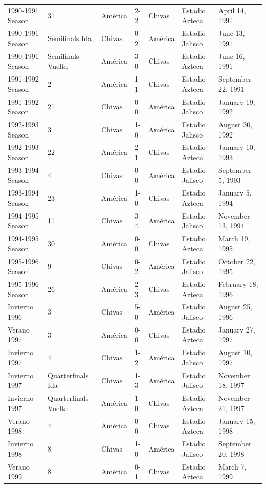 \documentclass{article}
\begin{document}
\begin{tabular}{lllllll}
1990-1991 Season & 31 & América & 2-2 & Chivas & Estadio Azteca & April 14, 1991 \\
1990-1991 Season & Semifinals Ida & Chivas & 0-2 & América & Estadio Jalisco & June 13, 1991 \\
1990-1991 Season & Semifinals Vuelta & América & 3-0 & Chivas & Estadio Azteca & June 16, 1991 \\
1991-1992 Season & 2 & América & 1-1 & Chivas & Estadio Azteca & September 22, 1991 \\
1991-1992 Season & 21 & Chivas & 0-0 & América & Estadio Jalisco & January 19, 1992 \\
1992-1993 Season & 3 & Chivas & 1-0 & América & Estadio Jalisco & August 30, 1992 \\
1992-1993 Season & 22 & América & 2-1 & Chivas & Estadio Azteca & January 10, 1993 \\
1993-1994 Season & 4 & Chivas & 0-0 & América & Estadio Jalisco & September 5, 1993 \\
1993-1994 Season & 23 & América & 1-0 & Chivas & Estadio Azteca & January 5, 1994 \\
1994-1995 Season & 11 & Chivas & 3-4 & América & Estadio Jalisco & November 13, 1994 \\
1994-1995 Season & 30 & América & 0-0 & Chivas & Estadio Azteca & March 19, 1995 \\
1995-1996 Season & 9 & Chivas & 0-2 & América & Estadio Jalisco & October 22, 1995 \\
1995-1996 Season & 26 & América & 2-3 & Chivas & Estadio Azteca & February 18, 1996 \\
Invierno 1996 & 3 & Chivas & 5-0 & América & Estadio Jalisco & August 25, 1996 \\
Verano 1997 & 3 & América & 0-0 & Chivas & Estadio Azteca & January 27, 1997 \\
Invierno 1997 & 4 & Chivas & 1-2 & América & Estadio Jalisco & August 10, 1997 \\
Invierno 1997 & Quarterfinals Ida & Chivas & 1-3 & América & Estadio Jalisco & November 18, 1997 \\
Invierno 1997 & Quarterfinals Vuelta & América & 1-0 & Chivas & Estadio Azteca & November 21, 1997 \\
Verano 1998 & 4 & América & 0-0 & Chivas & Estadio Azteca & January 15, 1998 \\
Invierno 1998 & 8 & Chivas & 1-0 & América & Estadio Jalisco & September 20, 1998 \\
Verano 1999 & 8 & América & 0-1 & Chivas & Estadio Azteca & March 7, 1999 \\

\end{tabular}
\end{document}
